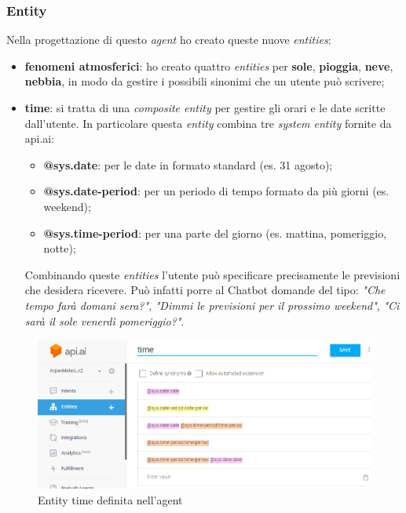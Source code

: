 \subsubsection{Entity}
Nella progettazione di questo \emph{agent} ho creato queste nuove \emph{entities}:
\begin{itemize}
	\item \textbf{fenomeni atmosferici}: ho creato quattro \emph{entities} per \textbf{sole}, \textbf{pioggia}, \textbf{neve}, \textbf{nebbia}, in modo da gestire i possibili sinonimi che un utente può scrivere;
	\item \textbf{time}: si tratta di una \emph{composite entity} per gestire gli orari e le date scritte dall'utente. In particolare questa \emph{entity} combina tre \emph{system entity} fornite da api.ai:
	\begin{itemize}
		\item \textbf{@sys.date}: per le date in formato standard (es. 31 agosto);
		\item \textbf{@sys.date-period}: per un periodo di tempo formato da più giorni (es. weekend);
		\item \textbf{@sys.time-period}: per una parte del giorno (es. mattina, pomeriggio, notte);
	\end{itemize}
Combinando queste \emph{entities} l'utente può specificare precisamente le previsioni che desidera ricevere. Può infatti porre al \gls{Chatbot} domande del tipo: \emph{"Che tempo farà domani sera?"}, \emph{"Dimmi le previsioni per il prossimo weekend"}, \emph{"Ci sarà il sole venerdì pomeriggio?"}.
\end{itemize}
\begin{figure}[!h]
	\centering
	\includegraphics[scale=0.5]{../Immagini/time.png}
	\caption{Entity time definita nell'agent}
\end{figure}
\newpage
